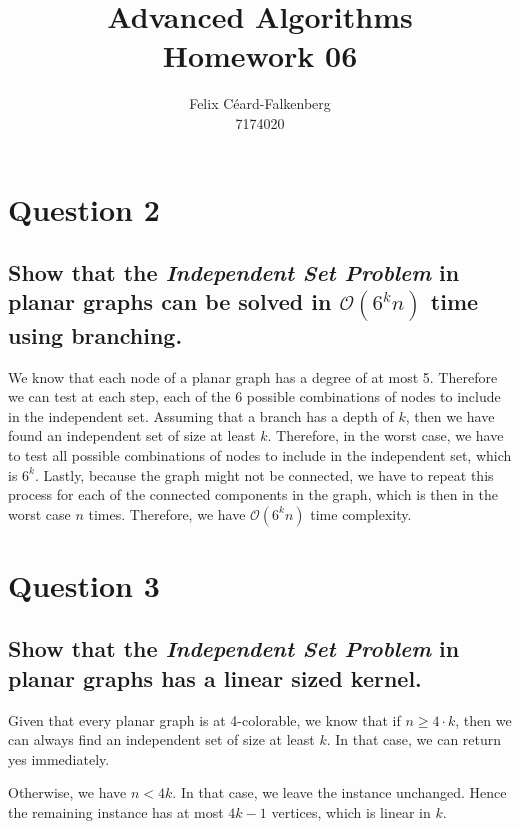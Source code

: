 \documentclass{article}
\title{Advanced Algorithms\\Homework 06}
\author{Felix Céard-Falkenberg\\7174020}
\begin{document}
\section{Question 2}

\subsection{\textbf{Show that the \textit{Independent Set Problem} in planar graphs can be solved in $\mathcal{O}(6^k n)$ time using branching.}}

We know that each node of a planar graph has a degree of at most 5. 
Therefore we can test at each step, each of the 6 possible combinations of nodes to include in the independent set. 
Assuming that a branch has a depth of $k$, then we have found an independent set of size at least $k$.
Therefore, in the worst case, we have to test all possible combinations of nodes to include in the independent set, which is $6^k$. Lastly, because the graph might not be connected, we have to repeat this process for each of the connected components in the graph, which is then in the worst case $n$ times. Therefore, we have $\mathcal{O}(6^k n)$ time complexity.

\section{Question 3}
\subsection{\textbf{Show that the \textit{Independent Set Problem} in planar graphs has a linear sized kernel.}}

Given that every planar graph is at 4-colorable, we know that if $n \geq 4 \cdot k$, then we can always find an independent set of size at least $k$. In that case, we can return yes immediately.

Otherwise, we have $n < 4k$. In that case, we leave the instance unchanged. Hence the remaining instance has at most $4k-1$ vertices, which is linear in $k$.

\end{document}
